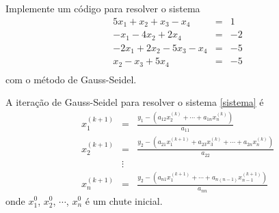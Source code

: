 \begin{exer}
Implemente um código para resolver o sistema
\begin{eqnarray*}
5x_1+x_2+x_3-x_4&=&1\\
-x_1-4x_2+2x_4&=&-2\\
-2x_1+2x_2-5x_3-x_4&=&-5\\
x_2-x_3+5x_4&=&-5\\
\end{eqnarray*}
com o método de Gauss-Seidel.

A iteração de Gauss-Seidel para resolver o sistema \ref{sistema} é
\begin{eqnarray*}
x_1^{(k+1)}&=&\frac{y_1 - \left(a_{12}x_2^{(k)}+\cdots+a_{1n}x_n^{(k)}\right)}{a_{11}}\\
x_2^{(k+1)}&=&\frac{y_2 - \left(a_{21}x_1^{(k+1)}+a_{23}x_3^{(k)}+\cdots+a_{2n}x_n^{(k)}\right)}{a_{22}}\\
&\vdots&\\
x_n^{(k+1)}&=&\frac{y_2 - \left(a_{n1}x_1^{(k+1)}+\cdots+a_{n(n-1)}x_{n-1}^{(k+1)}\right)}{a_{nn}}
\end{eqnarray*}
onde $x_1^0$, $x_2^0$, $\cdots$, $x_n^0$ é um chute inicial.
\end{exer}


